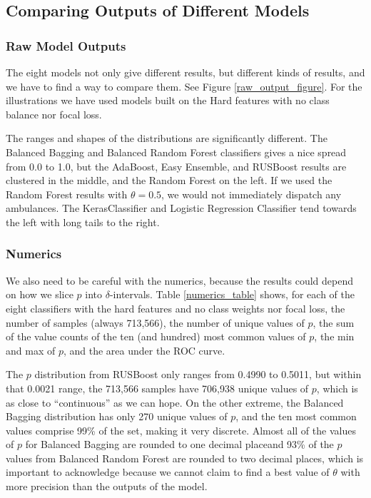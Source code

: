 \FloatBarrier
\subsection{Comparing Outputs of Different Models}
\label{comparing_outputs}

\subsubsection{Raw Model Outputs}
\label{raw_output}

The eight models not only give different results, but different kinds of results, and we have to find a way to compare them.  See Figure \ref{raw_output_figure}.  For the illustrations we have used models built on the Hard features with no class balance nor focal loss.

The ranges and shapes of the distributions are significantly different.  The Balanced Bagging and  Balanced Random Forest classifiers gives a nice spread from 0.0 to 1.0, but the AdaBoost, Easy Ensemble, and RUSBoost results are clustered in the middle, and the Random Forest on the left.  If we used the Random Forest results with $\theta = 0.5$, we would not immediately dispatch any ambulances.  The KerasClassifier and Logistic Regression Classifier tend towards the left with long tails to the right.  



\FloatBarrier

\subsubsection{Numerics}
\label{numerics}

We also need to be careful with the numerics, because the results could depend on how we slice $p$ into $\delta$-intervals.  Table \ref{numerics_table} shows, for each of the eight classifiers with the hard features and no class weights nor focal loss, the number of samples (always 713,566), the number of unique values of $p$, the sum of the value counts of the ten (and hundred) most common values of $p$, the min and max of $p$, and the area under the ROC curve.  


The $p$ distribution from RUSBoost only ranges from 0.4990 to 0.5011, but within that 0.0021 range, the 713,566 samples have 706,938 unique values of $p$, which is as close to ``continuous'' as we can hope.  On the other extreme, the Balanced Bagging distribution has only 270 unique values of $p$, and the ten most common values comprise 99\% of the set, making it very discrete.  Almost all of the values of $p$ for Balanced Bagging are rounded to one decimal placeand 93\% of the $p$ values from Balanced Random Forest are rounded to two decimal places, which is important to acknowledge because we cannot claim to find a best value of $\theta$ with more precision than the outputs of the model.

